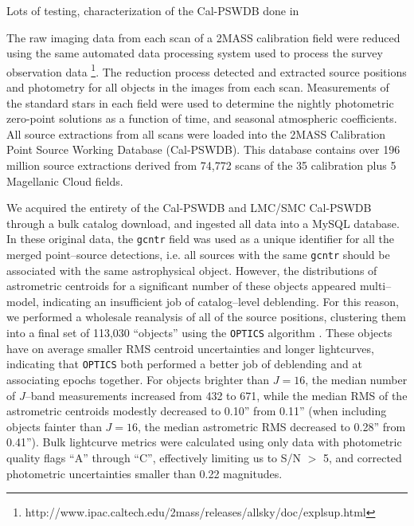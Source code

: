 \documentclass[]{emulateapj}
\begin{document}
Lots of testing, characterization of the Cal-PSWDB done in \citep{plavchanphd,plavchan2008a}

The raw imaging data from each scan of a 2MASS calibration field were reduced using the same automated data processing system used to process the survey observation data \footnote{http://www.ipac.caltech.edu/2mass/releases/allsky/doc/explsup.html}. The reduction process detected and extracted source positions and photometry for all objects in the images from each scan. Measurements of the standard stars in each field were used to determine the nightly photometric zero-point solutions as a function of time, and seasonal atmospheric coefficients. All source extractions from all scans were loaded into the 2MASS Calibration Point Source Working Database (Cal-PSWDB). This database contains over 196 million source extractions derived from 74,772 scans of the 35 calibration plus 5 Magellanic Cloud fields. 

We acquired the entirety of the Cal-PSWDB and LMC/SMC Cal-PSWDB
through a bulk catalog download, and ingested all data into a MySQL
database.  In these original data, the {\tt gcntr} field was used as a
unique identifier for all the merged point--source detections,
i.e. all sources with the same {\tt gcntr} should be associated with
the same astrophysical object.  However, the distributions of
astrometric centroids for a significant number of these objects
appeared multi--model, indicating an insufficient job of
catalog--level deblending.  For this reason, we performed a wholesale
reanalysis of all of the source positions, clustering them into a
final set of 113,030 ``objects'' using the {\tt OPTICS} algorithm
\cite{optics}.  These objects have on average smaller RMS centroid
uncertainties and longer lightcurves, indicating that {\tt OPTICS}
both performed a better job of deblending and at associating epochs
together.  For objects brighter than $J = 16$, the median number of
$J$--band measurements increased from 432 to 671, while the median RMS
of the astrometric centroids modestly decreased to 0.10'' from 0.11''
(when including objects fainter than $J=16$, the median astrometric
RMS decreased to 0.28'' from 0.41'').  Bulk lightcurve metrics were
calculated using only data with photometric quality flags ``A''
through ``C'', effectively limiting us to S/N $>$ 5, and corrected
photometric uncertainties smaller than 0.22 magnitudes.
\end{document}
